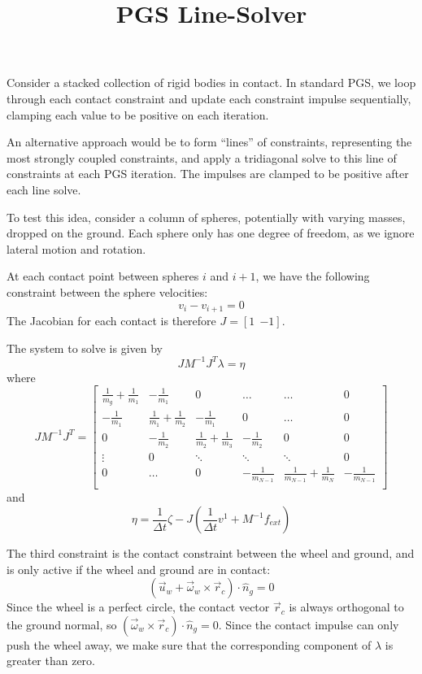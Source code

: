 \documentclass[9pt]{article}
\title{PGS Line-Solver}
\begin{document}
\maketitle

Consider a stacked collection of rigid bodies in contact. In standard PGS, we loop through each contact constraint and update each constraint impulse sequentially, clamping each value to be positive on each iteration. 

An alternative approach would be to form ``lines'' of constraints, representing the most strongly coupled constraints, and apply a tridiagonal solve to this line of constraints at each PGS iteration. The impulses are clamped to be positive after each line solve.

To test this idea, consider a column of spheres, potentially with varying masses, dropped on the ground. Each sphere only has one degree of freedom, as we ignore lateral motion and rotation.

At each contact point between spheres $i$ and $i+1$, we have the following constraint between the sphere velocities:
\[
v_i - v_{i+1} = 0
\]
The Jacobian for each contact is therefore $J = [1\ \ {-1}]$.

The system to solve is given by 
\[
JM^{-1}J^T \lambda = \eta
\]
where 
\[
JM^{-1}J^T = 
\left[
\begin{array}{cccccc}
\frac{1}{m_g} + \frac{1}{m_1} & -\frac{1}{m_1} & 0 & \hdots & \hdots & 0 \\
-\frac{1}{m_1} & \frac{1}{m_1} + \frac{1}{m_2} & -\frac{1}{m_1} & 0 & \hdots & 0 \\
0 & -\frac{1}{m_2} & \frac{1}{m_2} + \frac{1}{m_3} & -\frac{1}{m_2} & 0 & 0 \\
\vdots & 0 & \ddots & \ddots & \ddots & 0 \\
0 & \hdots & 0 & -\frac{1}{m_{N-1}} & \frac{1}{m_{N-1}} + \frac{1}{m_N} & -\frac{1}{m_{N-1}} \\
\end{array} 
\right]
\]
and 
\[
\eta = \frac{1}{\Delta t}\zeta - J\left(\frac{1}{\Delta t}v^1 + M^{-1}f_{ext}\right)
\]

The third constraint is the contact constraint between the wheel and ground, and is only active if the wheel and ground are in contact:
\[
(\vec{u}_w + \vec{\omega}_w \times \vec{r}_c) \cdot \hat{n}_g = 0
\]
Since the wheel is a perfect circle, the contact vector $\vec{r}_c$ is always orthogonal to the ground normal, so $(\vec{\omega}_w \times \vec{r}_c) \cdot \hat{n}_g = 0$. Since the contact impulse can only push the wheel away, we make sure that the corresponding component of $\lambda$ is greater than zero.
\end{document}

